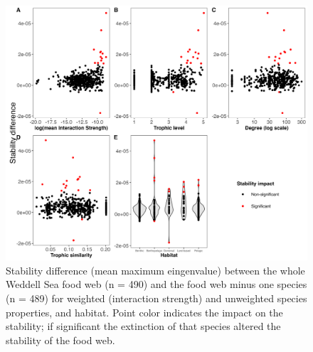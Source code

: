 \documentclass[gc, manuscript]{copernicus}
\begin{document}
\clearpage

\begin{figure}
\includegraphics[width=12cm]{Fig.5_QSSDif} \caption{Stability  difference (mean maximum eingenvalue) between the whole Weddell Sea food web (n = 490) and the food web minus one species (n = 489) for weighted (interaction strength) and unweighted species properties, and habitat. Point color indicates the impact on the stability; if significant the extinction of that species altered the stability of the food web.}\label{fig:unnamed-chunk-5}
\end{figure}

\clearpage
\end{document}
